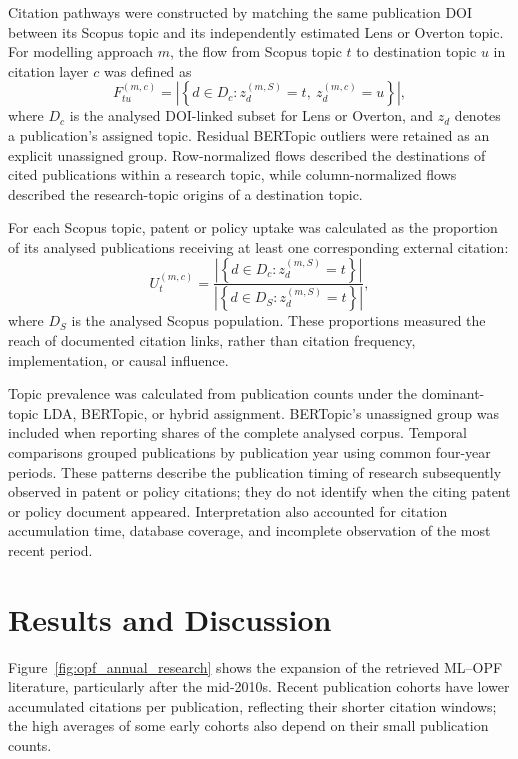 \documentclass[a4paper,fleqn]{cas-sc}
\begin{document}
Citation pathways were constructed by matching the same publication DOI between its Scopus topic and its independently estimated Lens or Overton topic. For modelling approach $m$, the flow from Scopus topic $t$ to destination topic $u$ in citation layer $c$ was defined as
\begin{equation}
F_{tu}^{(m,c)}=\left|\left\{d\in D_c:z_d^{(m,S)}=t,\ z_d^{(m,c)}=u\right\}\right|,
\end{equation}
where $D_c$ is the analysed DOI-linked subset for Lens or Overton, and $z_d$ denotes a publication's assigned topic. Residual BERTopic outliers were retained as an explicit unassigned group. Row-normalized flows described the destinations of cited publications within a research topic, while column-normalized flows described the research-topic origins of a destination topic.

For each Scopus topic, patent or policy uptake was calculated as the proportion of its analysed publications receiving at least one corresponding external citation:
\begin{equation}
U_t^{(m,c)}=\frac{\left|\left\{d\in D_c:z_d^{(m,S)}=t\right\}\right|}{\left|\left\{d\in D_S:z_d^{(m,S)}=t\right\}\right|},
\end{equation}
where $D_S$ is the analysed Scopus population. These proportions measured the reach of documented citation links, rather than citation frequency, implementation, or causal influence.

Topic prevalence was calculated from publication counts under the dominant-topic LDA, BERTopic, or hybrid assignment. BERTopic's unassigned group was included when reporting shares of the complete analysed corpus. Temporal comparisons grouped publications by publication year using common four-year periods. These patterns describe the publication timing of research subsequently observed in patent or policy citations; they do not identify when the citing patent or policy document appeared. Interpretation also accounted for citation accumulation time, database coverage, and incomplete observation of the most recent period.

\section{Results and Discussion}\label{sec:results_discussion}

Figure~\ref{fig:opf_annual_research} shows the expansion of the retrieved ML--OPF literature, particularly after the mid-2010s. Recent publication cohorts have lower accumulated citations per publication, reflecting their shorter citation windows; the high averages of some early cohorts also depend on their small publication counts.
\end{document}
